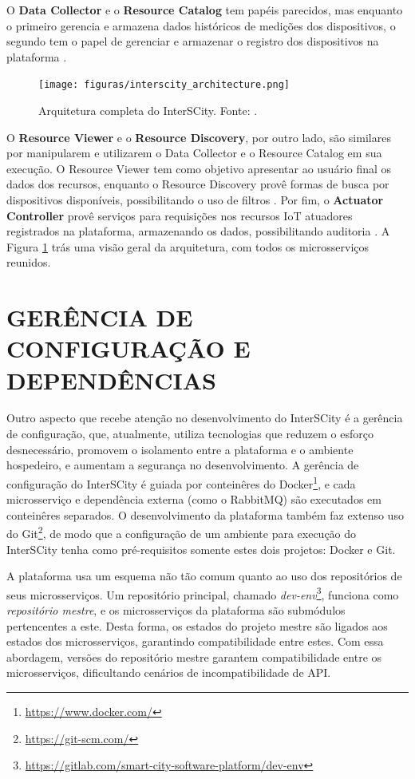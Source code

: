 O \textbf{Data Collector} e o \textbf{Resource Catalog} tem papéis parecidos,
mas enquanto o primeiro gerencia e armazena dados históricos de medições dos
dispositivos, o segundo tem o papel de gerenciar e armazenar o registro dos
dispositivos na plataforma \cite{delesposte2017}.

\begin{figure}
  \centering
    \texttt{[image: figuras/interscity\_architecture.png]}
    \caption{Arquitetura completa do InterSCity. Fonte: .}
  \label{fig:interscity-architecture}
\end{figure}


O \textbf{Resource Viewer} e o \textbf{Resource Discovery}, por outro lado,
são similares por manipularem e utilizarem o Data Collector e o Resource
Catalog em sua execução. O Resource Viewer tem como objetivo apresentar ao
usuário final os dados dos recursos, enquanto o Resource Discovery provê formas
de busca por dispositivos disponíveis, possibilitando o uso de filtros
\cite{delesposte2017}. Por fim, o \textbf{Actuator Controller} provê serviços
para requisições nos recursos IoT atuadores registrados na plataforma,
armazenando os dados, possibilitando auditoria \cite{delesposte2017}. A Figura
\ref{fig:interscity-architecture} trás uma visão geral da arquitetura, com todos
os microsserviços reunidos.

\section{GERÊNCIA DE CONFIGURAÇÃO E DEPENDÊNCIAS}

Outro aspecto que recebe atenção no desenvolvimento do InterSCity é a gerência
de configuração, que, atualmente, utiliza tecnologias que reduzem o esforço
desnecessário, promovem o isolamento entre a plataforma e o ambiente hospedeiro,
e aumentam a segurança no desenvolvimento. A gerência de configuração do
InterSCity é guiada por conteinêres do
Docker\footnote{\url{https://www.docker.com/}}, e cada microsserviço e
dependência externa (como o RabbitMQ) são executados em
conteinêres separados. O desenvolvimento da plataforma também faz extenso
uso do Git\footnote{\url{https://git-scm.com/}}, de modo que a
configuração de um ambiente para execução do InterSCity tenha como
pré-requisitos somente estes dois projetos: Docker e Git.

A plataforma usa um esquema não tão comum quanto ao uso dos repositórios de
seus microsserviços. Um repositório principal, chamado
\textit{dev-env}\footnote{\url{https://gitlab.com/smart-city-software-platform/dev-env}},
funciona como \textit{repositório mestre}, e os microsserviços da plataforma são
submódulos pertencentes a este. Desta forma, os estados do projeto mestre são
ligados aos estados dos microsserviços, garantindo compatibilidade entre estes.
Com essa abordagem, versões do repositório mestre garantem compatibilidade
entre os microsserviços, dificultando cenários de incompatibilidade de API.

